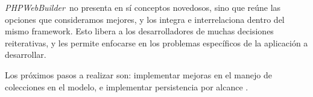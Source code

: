 \documentclass[a4paper,10pt]{article}
\newcommand{\comment}[1]{}
\newcommand{\PWB}{\emph{PHPWebBuilder}}
\newcommand{\sourcecode}[1]{
\begin{minipage}{12cm}
\begin{lgrind}

\end{lgrind}
\end{minipage}
}
\begin{document}
\PWB\ no presenta en sí conceptos novedosos, sino que reúne las opciones que consideramos mejores, y los integra e interrelaciona dentro del mismo framework. Esto libera a los desarrolladores de muchas decisiones reiterativas, y les permite enfocarse en los problemas específicos de la aplicación a desarrollar.

Los próximos pasos a realizar son: implementar mejoras en el manejo de colecciones en el modelo, e implementar persistencia por alcance \cite{jpox,jdo}.







\comment{
\setcounter{section}{0}
\newpage
\section*{Apéndices}
\section{Código completo}

Modelo:

\sourcecode{src/Post.class.php.tex}
\sourcecode{src/Tag.class.php.tex}

Controller:

\sourcecode{src/PostItem.class.php.tex}
\sourcecode{src/PostList.class.php.tex}
\sourcecode{src/BlogComponent.class.php.tex}
}
\end{document}

